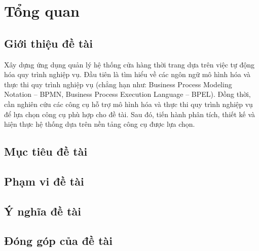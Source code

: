 \section{Tổng quan}
    \subsection{Giới thiệu đề tài}
Xây dựng ứng dụng quản lý hệ thống cửa hàng thời trang dựa trên việc tự động hóa quy trình nghiệp vụ. Đầu tiên là tìm hiểu về các ngôn ngữ mô hình hóa và thực thi quy trình nghiệp vụ (chẳng hạn như: Business Process Modeling Notation – BPMN, Business Process Execution Language – BPEL). Đồng thời, cần nghiên cứu các công cụ hỗ trợ mô hình hóa và thực thi quy trình nghiệp vụ để lựa chọn công cụ phù hợp cho đề tài. Sau đó, tiến hành phân tích, thiết kế và hiện thực hệ thống dựa trên nền tảng công cụ được lựa chọn.
    \subsection{Mục tiêu đề tài}
    
    \subsection{Phạm vi đề tài}
    
    \subsection{Ý nghĩa đề tài}
    
    \subsection{Đóng góp của đề tài}
